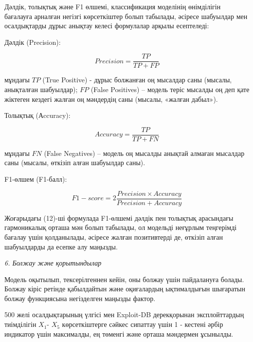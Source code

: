 Дәлдік, толықтық және F1 өлшемі, классификация моделінің өнімділігін
бағалауға арналған негізгі көрсеткіштер болып табылады, әсіресе
шабуылдар мен осалдықтарды дұрыс анықтау келесі формулалар арқылы
есептеледі:

Дәлдік (Precision):

\begin{equation}
Precision = \frac{TP}{TP + FP}
\end{equation}

мұндағы \(TP\) (True Positive) - дұрыс болжанған оң мысалдар саны
(мысалы, анықталған шабуылдар); \(FP\) (False Positives) -- модель теріс
мысалды оң деп қате жіктеген кездегі жалған оң мәндердің саны (мысалы,
«жалған дабыл»).

Толықтық (Аccuracy):

\[Accuracy = \frac{TP}{TP + FN}\]

мұндағы \(FN\) (False Negatives) -- модель оң мысалды анықтай алмаған
мысалдар саны (мысалы, өткізіп алған шабуылдар саны).

F1-өлшем (F1-балл):

\begin{equation}
F1 - score = 2\frac{Precision \times Accuracy}{Precision + Accuracy}
\end{equation}

Жоғарыдағы (12)-ші формулада F1-өлшемі дәлдік пен толықтық арасындағы
гармоникалық орташа мән болып табылады, ол модельді неғұрлым теңгерімді
бағалау үшін қолданылады, әсіресе жалған позитивтерді де, өткізіп алған
шабуылдарды да есепке алу маңызды.

\emph{6. Болжау және қорытындылар}

Модель оқытылып, тексерілгеннен кейін, оны болжау үшін пайдалануға
болады. Болжау кіріс ретінде қабылдайтын және оқиғалардың ықтималдығын
шығаратын болжау функциясына негізделген маңызды фактор.

500 желі осалдықтарының үлгісі мен Exploit-DB дерекқорынан
эксплойттардың тиімділігін \(X_{1}\)- \(X_{5}\) көрсеткіштерге сәйкес
сипаттау үшін 1 - кестені әрбір индикатор үшін максималды, ең төменгі
және орташа мәндермен ұсынылды.

